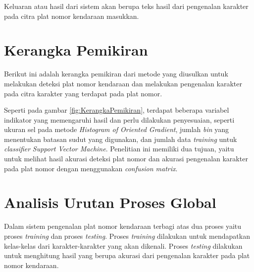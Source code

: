 \noindent Keluaran atau hasil dari sistem akan berupa teks hasil dari pengenalan karakter pada citra plat nomor kendaraan masukkan.\\ 

\section{Kerangka Pemikiran}
\noindent Berikut ini adalah kerangka pemikiran dari metode yang diusulkan untuk melakukan deteksi plat nomor kendaraan dan melakukan pengenalan karakter pada citra karakter yang terdapat pada plat nomor.\\

\begin{adjustbox}{width=1\textwidth}
	\noindent\begin{minipage}{\linewidth}
	\label{fig:KerangkaPemikiran}
\end{minipage}
\end{adjustbox}

\noindent Seperti pada gambar \ref{fig:KerangkaPemikiran}, terdapat beberapa variabel indikator yang memengaruhi hasil dan perlu dilakukan penyesuaian, seperti ukuran sel pada metode \textit{Histogram of Oriented Gradient}, jumlah \textit{bin} yang menentukan batasan sudut yang digunakan, dan jumlah data \textit{training} untuk \textit{classifier} \textit{Support Vector Machine}. Penelitian ini memiliki dua tujuan, yaitu untuk melihat hasil akurasi deteksi plat nomor dan akurasi pengenalan karakter pada plat nomor dengan menggunakan \textit{confusion matrix}.\\

\section{Analisis Urutan Proses Global}
\noindent Dalam sistem pengenalan plat nomor kendaraan terbagi atas dua proses yaitu proses \textit{training} dan proses \textit{testing}. Proses \textit{training} dilakukan untuk mendapatkan kelas-kelas dari karakter-karakter yang akan dikenali. Proses \textit{testing} dilakukan untuk menghitung hasil yang berupa akurasi dari pengenalan karakter pada plat nomor kendaraan.\\

